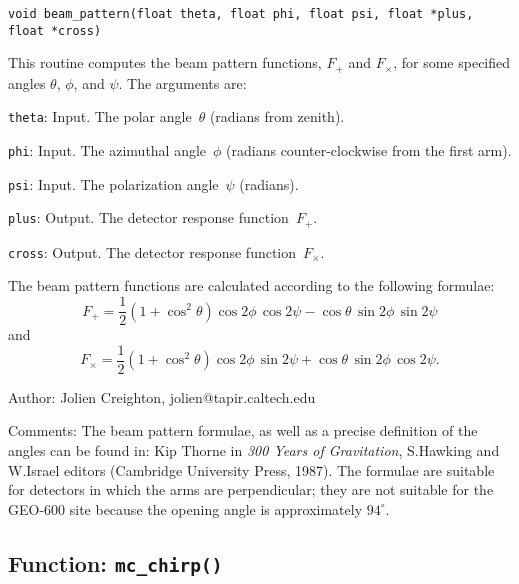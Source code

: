 \begin{verbatim}
void beam_pattern(float theta, float phi, float psi, float *plus, float *cross)
\end{verbatim}

This routine computes the beam pattern functions, $F_+$ and $F_\times$,
for some specified angles $\theta$, $\phi$, and $\psi$.  The arguments are:
\begin{description}
\item{\texttt{theta}}: Input.  The polar angle~$\theta$ (radians from zenith).
\item{\texttt{phi}}: Input.  The azimuthal angle~$\phi$ (radians
  counter-clockwise from the first arm).
\item{\texttt{psi}}: Input.  The polarization angle~$\psi$ (radians).
\item{\texttt{plus}}: Output.  The detector response function~$F_+$.
\item{\texttt{cross}}: Output.  The detector response function~$F_\times$.
\end{description}

The beam pattern functions are calculated according to the following formulae:
\begin{equation}
  F_+ = {\textstyle\frac{1}{2}}(1+\cos^2\theta)\cos2\phi\, \cos2\psi
    - \cos\theta\, \sin2\phi\, \sin2\psi
\end{equation}
and
\begin{equation}
  F_\times = {\textstyle\frac{1}{2}}(1+\cos^2\theta)\cos2\phi\, \sin2\psi
    + \cos\theta\, \sin2\phi\, \cos2\psi.
\end{equation}

\begin{description}
\item{Author:} Jolien Creighton, jolien@tapir.caltech.edu
\item{Comments:}  The beam pattern formulae, as well as a precise definition
  of the angles can be found in:
  Kip Thorne in \emph{300 Years of Gravitation}, S.\@ Hawking and W.\@ Israel
  editors (Cambridge University Press, 1987).  The formulae are suitable for
  detectors in which the arms are perpendicular; they are not suitable for the
  GEO-600 site because the opening angle is approximately $94^\circ$.
\end{description}


\clearpage
\subsection{Function: \texttt{mc\_chirp()}}
\label{ss:mc_chirp}

